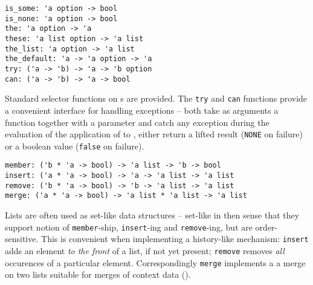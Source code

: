 \begin{isabellebody}
\begin{isamarkuptext}
\begin{mldecls}
  \verb|is_some: 'a option -> bool| \\
  \verb|is_none: 'a option -> bool| \\
  \verb|the: 'a option -> 'a| \\
  \verb|these: 'a list option -> 'a list| \\
  \verb|the_list: 'a option -> 'a list| \\
  \verb|the_default: 'a -> 'a option -> 'a| \\
  \verb|try: ('a -> 'b) -> 'a -> 'b option| \\
  \verb|can: ('a -> 'b) -> 'a -> bool| \\
  \end{mldecls}%
\end{isamarkuptext}%
\isamarkuptrue%
%
\endisatagmlref
{\isafoldmlref}%
%
\isadelimmlref
%
\endisadelimmlref
%
\begin{isamarkuptext}%
Standard selector functions on s are provided.
  The \verb|try| and \verb|can| functions provide a convenient
  interface for handling exceptions -- both take as arguments
  a function  together with a parameter 
  and catch any exception during the evaluation of the application
  of  to , either return a lifted result
  (\verb|NONE| on failure) or a boolean value (\verb|false| on failure).%
\end{isamarkuptext}%
\isamarkuptrue%
%
\isamarkuptrue%
%
\isamarkuptrue%
%
\begin{isamarkuptext}%
\begin{mldecls}
  \verb|member: ('b * 'a -> bool) -> 'a list -> 'b -> bool| \\
  \verb|insert: ('a * 'a -> bool) -> 'a -> 'a list -> 'a list| \\
  \verb|remove: ('b * 'a -> bool) -> 'b -> 'a list -> 'a list| \\
  \verb|merge: ('a * 'a -> bool) -> 'a list * 'a list -> 'a list| \\
  \end{mldecls}%
\end{isamarkuptext}%
\isamarkuptrue%
%
\begin{isamarkuptext}%
Lists are often used as set-like data structures -- set-like in
  then sense that they support notion of \verb|member|-ship,
  \verb|insert|-ing and \verb|remove|-ing, but are order-sensitive.
  This is convenient when implementing a history-like mechanism:
  \verb|insert| adds an element \emph{to the front} of a list,
  if not yet present; \verb|remove| removes \emph{all} occurences
  of a particular element.  Correspondingly \verb|merge| implements a 
  a merge on two lists suitable for merges of context data
  ().


\end{isamarkuptext}
\end{isabellebody}
